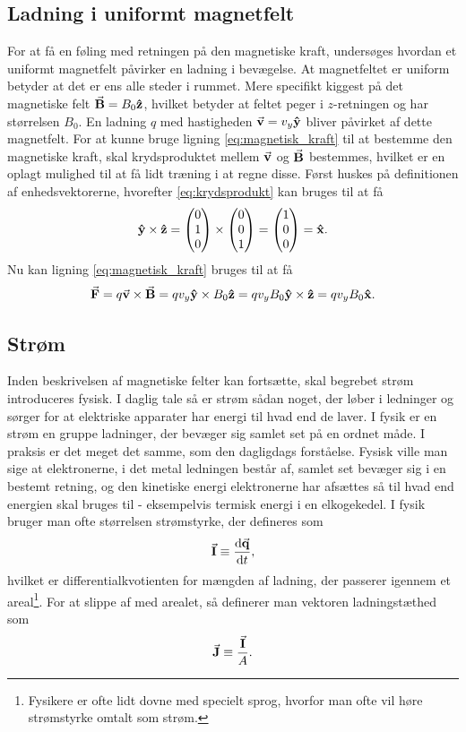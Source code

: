\subsection{Ladning i uniformt magnetfelt} \label{sec:uniformt_b-felt}
For at få en føling med retningen på den magnetiske kraft, undersøges hvordan et uniformt magnetfelt påvirker en ladning i bevægelse. At magnetfeltet er uniform betyder at det er ens alle steder i rummet. Mere specifikt kiggest på det magnetiske felt $\va B = B_0 \vu z$, hvilket betyder at feltet peger i $z$-retningen og har størrelsen $B_0$. En ladning $q$ med hastigheden $\va v = v_y \vu y$ bliver påvirket af dette magnetfelt. For at kunne bruge ligning \eqref{eq:magnetisk_kraft} til at bestemme den magnetiske kraft, skal krydsproduktet mellem $\va v$ og $\va B$ bestemmes, hvilket er en oplagt mulighed til at få lidt træning i at regne disse. Først huskes på definitionen af enhedsvektorerne, hvorefter \ref{eq:krydsprodukt} kan bruges til at få
%
\begin{align}
    \vu y \times \vu z = \begin{pmatrix}0\\1\\0\end{pmatrix} \times \begin{pmatrix}0\\0\\1\end{pmatrix} = \begin{pmatrix}1\\0\\0\end{pmatrix} = \vu x.
\end{align}
%
Nu kan ligning \eqref{eq:magnetisk_kraft} bruges til at få
%
\begin{align}
    \va F = q\va v \times \va B = qv_y\vu y \times B_0 \vu z = qv_yB_0\vu y \times \vu z = qv_yB_0\vu x.
\end{align}

\subsection{Strøm}
Inden beskrivelsen af magnetiske felter kan fortsætte, skal begrebet strøm introduceres fysisk. I daglig tale så er strøm sådan noget, der løber i ledninger og sørger for at elektriske apparater har energi til hvad end de laver. I fysik er en strøm en gruppe ladninger, der bevæger sig samlet set på en ordnet måde. I praksis er det meget det samme, som den dagligdags forståelse. Fysisk ville man sige at elektronerne, i det metal ledningen består af, samlet set bevæger sig i en bestemt retning, og den kinetiske energi elektronerne har afsættes så til hvad end energien skal bruges til - eksempelvis termisk energi i en elkogekedel. I fysik bruger man ofte størrelsen strømstyrke, der defineres som
%
\begin{align} \label{eq:current}
    \va I \equiv \dv{\va q}{t},
\end{align}
%
hvilket er differentialkvotienten for mængden af ladning, der passerer igennem et areal\footnote{Fysikere er ofte lidt dovne med specielt sprog, hvorfor man ofte vil høre strømstyrke omtalt som strøm.}. For at slippe af med arealet, så definerer man vektoren ladningstæthed som
%
\begin{align} \label{eq:current_density}
    \va J \equiv \frac{\va I}{A}.
\end{align}

